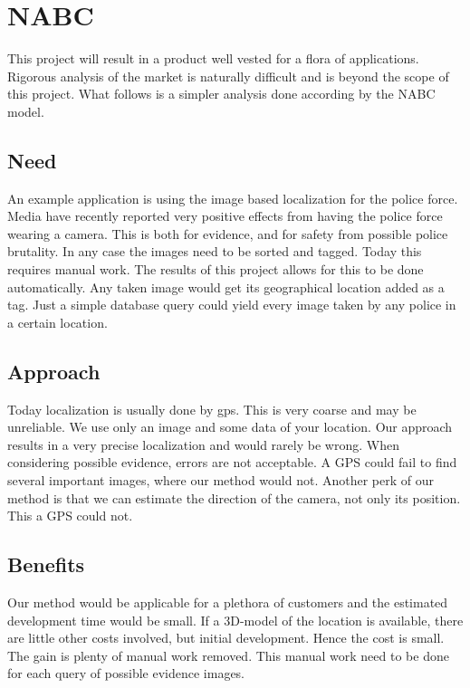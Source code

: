 \section{NABC}
This project will result in a product well vested for a flora of applications. Rigorous analysis of the market is naturally difficult and is beyond the scope of this project. What follows is a simpler analysis done according by the NABC model.

\subsection{Need}
An example application is using the image based localization for the police force. Media have recently reported very positive effects from having the police force wearing a camera. This is both for evidence, and for safety from possible police brutality. In any case the images need to be sorted and tagged. Today this requires manual work. The results of this project allows for this to be done automatically. Any taken image would get its geographical location added as a tag. Just a simple database query could yield every image taken by any police in a certain location.\\


\subsection{Approach}
Today localization is usually done by gps. This is very coarse and may be unreliable. We use only an image and some data of your location. Our approach results in a very precise localization and would rarely be wrong. When considering possible evidence, errors are not acceptable. A GPS could fail to find several important images, where our method would not. Another perk of our method is that we can estimate the direction of the camera, not only its position. This a GPS could not.\\

\subsection{Benefits}
Our method would be applicable for a plethora of customers and the estimated development time would be small. If a 3D-model of the location is available, there are little other costs involved, but initial development. Hence the cost is small. The gain is plenty of manual work removed. This manual work need to be done for each query of possible evidence images.

